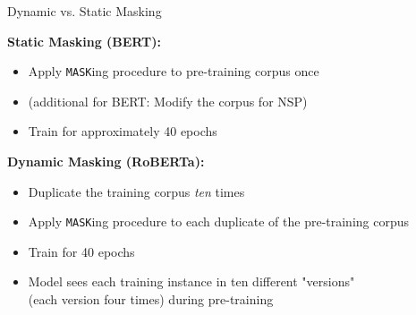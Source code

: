 \begin{frame}{Dynamic vs. Static Masking}

\vfill

	\textbf{Static Masking (BERT):}

	\begin{itemize}
		\item Apply \texttt{MASK}ing procedure to pre-training corpus once
		\item (additional for BERT: Modify the corpus for NSP)
		\item Train for approximately 40 epochs
	\end{itemize}

\vspace{.3cm}

	\textbf{Dynamic Masking (RoBERTa):}

	\begin{itemize}
		\item Duplicate the training corpus \textit{ten} times
		\item Apply \texttt{MASK}ing procedure to each duplicate of the pre-training corpus
		\item Train for 40 epochs
		\item Model sees each training instance in ten different "versions"\\
					(each version four times) during pre-training
	\end{itemize}
	
\vfill

\end{frame}


